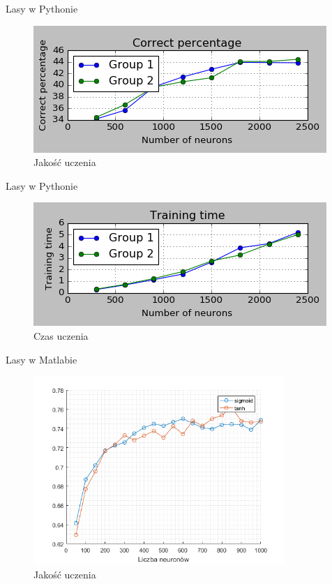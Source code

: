 \documentclass{beamer}
\begin{document}
\begin{frame}{Lasy w Pythonie}
\begin{figure}[H]
\includegraphics[width=\textwidth]{wyniki_forest_python_percentage.png}
\caption{Jakość uczenia}
\end{figure}
\end{frame}

\begin{frame}{Lasy w Pythonie}
\begin{figure}[H]
\includegraphics[width=\textwidth]{wyniki_forest_python_training_time.png}
\caption{Czas uczenia}
\end{figure}
\end{frame}

\begin{frame}{Lasy w Matlabie}
\begin{figure}[H]
\centering
\includegraphics[width=0.85\textwidth]{forest_liczba_neuronow.png}
\caption{Jakość uczenia}
\end{figure}
\end{frame}
\end{document}
